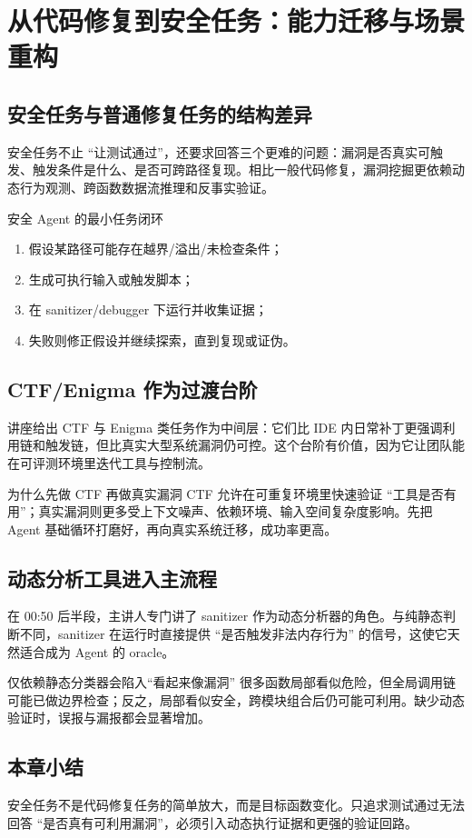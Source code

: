 \section{从代码修复到安全任务：能力迁移与场景重构}

\subsection{安全任务与普通修复任务的结构差异}
安全任务不止 ``让测试通过''，还要求回答三个更难的问题：漏洞是否真实可触发、触发条件是什么、是否可跨路径复现。相比一般代码修复，漏洞挖掘更依赖动态行为观测、跨函数数据流推理和反事实验证。

\begin{knowledgebox}{安全 Agent 的最小任务闭环}
\begin{enumerate}
    \item 假设某路径可能存在越界/溢出/未检查条件；
    \item 生成可执行输入或触发脚本；
    \item 在 sanitizer/debugger 下运行并收集证据；
    \item 失败则修正假设并继续探索，直到复现或证伪。
\end{enumerate}
\end{knowledgebox}

\subsection{CTF/Enigma 作为过渡台阶}
讲座给出 CTF 与 Enigma 类任务作为中间层：它们比 IDE 内日常补丁更强调利用链和触发链，但比真实大型系统漏洞仍可控。这个台阶有价值，因为它让团队能在可评测环境里迭代工具与控制流。

\begin{importantbox}{为什么先做 CTF 再做真实漏洞}
CTF 允许在可重复环境里快速验证 ``工具是否有用''；真实漏洞则更多受上下文噪声、依赖环境、输入空间复杂度影响。先把 Agent 基础循环打磨好，再向真实系统迁移，成功率更高。
\end{importantbox}

\subsection{动态分析工具进入主流程}
在 00:50 后半段，主讲人专门讲了 sanitizer 作为动态分析器的角色。与纯静态判断不同，sanitizer 在运行时直接提供 ``是否触发非法内存行为'' 的信号，这使它天然适合成为 Agent 的 oracle。

\begin{warningbox}{仅依赖静态分类器会陷入“看起来像漏洞”}
很多函数局部看似危险，但全局调用链可能已做边界检查；反之，局部看似安全，跨模块组合后仍可能可利用。缺少动态验证时，误报与漏报都会显著增加。
\end{warningbox}

\subsection{本章小结}
安全任务不是代码修复任务的简单放大，而是目标函数变化。只追求测试通过无法回答 ``是否真有可利用漏洞''，必须引入动态执行证据和更强的验证回路。

